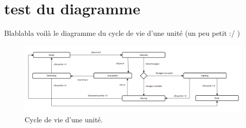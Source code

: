 \section{test du diagramme}

Blablabla voilà le diagramme du cycle de vie d'une unité (un peu petit :/ )

\begin{figure}[h]
            \centering
            \includegraphics[width=1\textwidth]{figure/unit_life_cycle_state_diagram.png}
            \caption{Cycle de vie d'une unité.}
            \label{fig:arbre_exemple_1}
\end{figure}